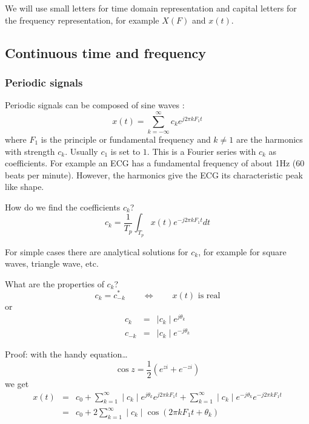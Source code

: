 \documentclass[12pt,a4paper]{article}
\begin{document}
We will use small letters for time domain representation
and capital letters for the frequency representation, for example
$X(F)$ and $x(t)$.

\subsection{Continuous time and frequency}

\subsubsection{Periodic signals}
Periodic signals can be composed of sine waves :
\begin{equation} 
x(t) = \sum_{k = -\infty}^{\infty} c_{k} e^{j2\pi k F_1 t}
\end{equation}
where $F_1$ is the principle or fundamental frequency and $k \neq 1$ are the
harmonics with strength $c_k$. Usually $c_1$ is set to $1$. This is a
Fourier series with $c_{k}$ as coefficients. For example an
ECG has a fundamental frequency of about 1Hz (60 beats per minute).
However, the harmonics give the ECG its characteristic peak like shape.

How do we find the coefficients $c_k$?
\begin{equation} 
c_{k} = \frac{1}{T_p} \int_{T_p} x(t) e^{-j2 \pi k F_1 t} dt
\end{equation}

For simple cases there are analytical solutions for $c_k$, for example
for square waves, triangle wave, etc.

What are the properties of $c_{k}$?
\begin{equation}
c_{k} = c_{- k}^{*} \qquad \Leftrightarrow \qquad x(t)\mbox{ is real}
\end{equation}
or
\begin{eqnarray}
c_{k} &=& \mid c_k \mid e^{j \theta_k} \\
c_{-k} &=& \mid c_k \mid e^{-j \theta_k}
\end{eqnarray}

Proof: with the handy equation\ldots
\begin{equation}
\cos z = \frac{1}{2} \left(e^{zi} + e^{-zi}\right)
\end{equation}
we get
\begin{eqnarray} 
x(t) & = & c_0 + \sum_{k = 1}^{\infty} \mid c_k \mid e^{j \theta_k} e^{j 2\pi k F_1 t}
               + \sum_{k = 1}^{\infty} \mid c_{k}\mid e^{-j \theta_k} e^{-j 2\pi k F_1 t} \\
     & = & c_0 + 2 \sum_{k = 1}^{\infty} \mid c_k \mid \cos(2 \pi k F_1 t + \theta_{k})
\end{eqnarray}
\end{document}
